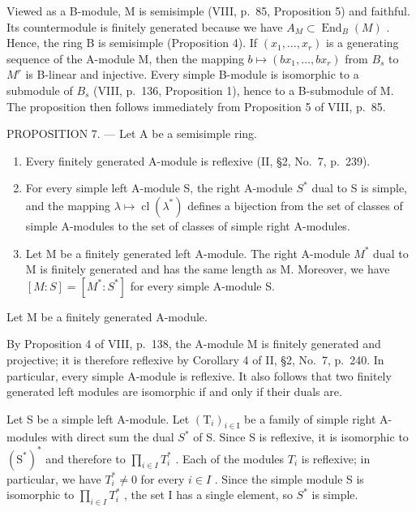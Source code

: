 Viewed as a B-module, M is semisimple (VIII, p.~85, Proposition 5) and faithful. Its countermodule is finitely generated because we have \(A_{M} \subset \operatorname{End}_{B}(M)\) . Hence, the ring B is semisimple (Proposition 4). If \((x_{1}, \ldots, x_{r})\) is a generating sequence of the A-module M, then the mapping \(b \mapsto (bx_{1}, \ldots, bx_{r})\) from \(B_{s}\) to \(M^{r}\) is B-linear and injective. Every simple B-module is isomorphic to a submodule of \(B_{s}\) (VIII, p.~136, Proposition 1), hence to a B-submodule of M. The proposition then follows immediately from Proposition 5 of VIII, p.~85.

PROPOSITION 7. --- Let A be a semisimple ring.

\begin{enumerate}
\def\labelenumi{\alph{enumi})}
\item
  Every finitely generated A-module is reflexive (II, §2, No.~7, p.~239).
\item
  For every simple left A-module S, the right A-module \(S^{*}\) dual to S is simple, and the mapping \(\lambda \mapsto \operatorname{cl}(\lambda^{*})\) defines a bijection from the set of classes of simple A-modules to the set of classes of simple right A-modules.
\item
  Let M be a finitely generated left A-module. The right A-module \(M^{*}\) dual to M is finitely generated and has the same length as M. Moreover, we have \([M:S]=[M^{*}:S^{*}]\) for every simple A-module S.
\end{enumerate}

Let \(\mathrm{M}\) be a finitely generated A-module.

By Proposition 4 of VIII, p.~138, the A-module M is finitely generated and projective; it is therefore reflexive by Corollary 4 of II, §2, No.~7, p.~240. In particular, every simple A-module is reflexive. It also follows that two finitely generated left modules are isomorphic if and only if their duals are.

Let S be a simple left A-module. Let \((\mathrm{T}_{i})_{i\in\mathrm{I}}\) be a family of simple right A-modules with direct sum the dual \(S^{*}\) of S. Since S is reflexive, it is isomorphic to \((\mathrm{S}^{*})^{*}\) and therefore to \(\prod_{i\in I}T_{i}^{*}\) . Each of the modules \(T_{i}\) is reflexive; in particular, we have \(T_{i}^{*}\neq0\) for every \(i\in I\) . Since the simple module S is isomorphic to \(\prod_{i\in I}T_{i}^{*}\) , the set I has a single element, so \(S^{*}\) is simple.

